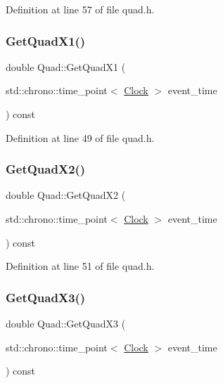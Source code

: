 Definition at line 57 of file quad.\+h.

\mbox{\label{class_quad_a7b0e34a18832713528b861f7ed35e139}} 
\subsubsection{\texorpdfstring{Get\+Quad\+X1()}{GetQuadX1()}}
{\footnotesize\ttfamily double Quad\+::\+Get\+Quad\+X1 (\begin{DoxyParamCaption}\item[{std\+::chrono\+::time\+\_\+point$<$ \hyperlink{universe_8h_a0ef8d951d1ca5ab3cfaf7ab4c7a6fd80}{Clock} $>$}]{event\+\_\+time }\end{DoxyParamCaption}) const\hspace{0.3cm}{\ttfamily [inline]}}



Definition at line 49 of file quad.\+h.

\mbox{\label{class_quad_a2974623eaf17fe5bef35e8c4638149d6}} 
\subsubsection{\texorpdfstring{Get\+Quad\+X2()}{GetQuadX2()}}
{\footnotesize\ttfamily double Quad\+::\+Get\+Quad\+X2 (\begin{DoxyParamCaption}\item[{std\+::chrono\+::time\+\_\+point$<$ \hyperlink{universe_8h_a0ef8d951d1ca5ab3cfaf7ab4c7a6fd80}{Clock} $>$}]{event\+\_\+time }\end{DoxyParamCaption}) const\hspace{0.3cm}{\ttfamily [inline]}}



Definition at line 51 of file quad.\+h.

\mbox{\label{class_quad_aaa044d9683717efd054d82f553b3337d}} 
\subsubsection{\texorpdfstring{Get\+Quad\+X3()}{GetQuadX3()}}
{\footnotesize\ttfamily double Quad\+::\+Get\+Quad\+X3 (\begin{DoxyParamCaption}\item[{std\+::chrono\+::time\+\_\+point$<$ \hyperlink{universe_8h_a0ef8d951d1ca5ab3cfaf7ab4c7a6fd80}{Clock} $>$}]{event\+\_\+time }\end{DoxyParamCaption}) const\hspace{0.3cm}{\ttfamily [inline]}}



